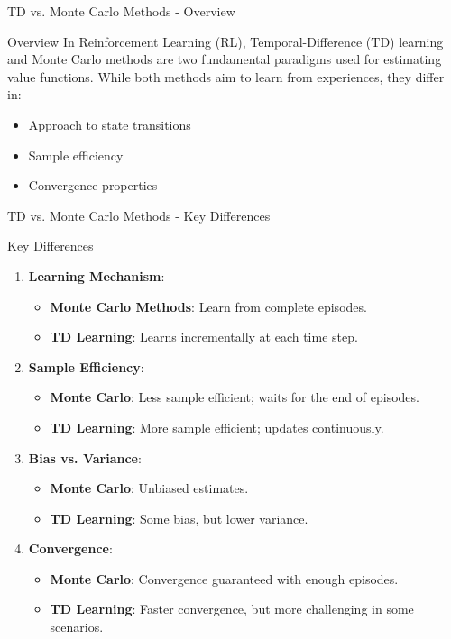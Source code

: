 \documentclass[aspectratio=169]{beamer}
\begin{document}
\begin{frame}[fragile]{TD vs. Monte Carlo Methods - Overview}
    \begin{block}{Overview}
        In Reinforcement Learning (RL), Temporal-Difference (TD) learning and Monte Carlo methods are two fundamental paradigms used for estimating value functions. While both methods aim to learn from experiences, they differ in:
        \begin{itemize}
            \item Approach to state transitions
            \item Sample efficiency
            \item Convergence properties
        \end{itemize}
    \end{block}
\end{frame}

\begin{frame}[fragile]{TD vs. Monte Carlo Methods - Key Differences}
    \begin{block}{Key Differences}
        \begin{enumerate}
            \item \textbf{Learning Mechanism}:
            \begin{itemize}
                \item \textbf{Monte Carlo Methods}: Learn from complete episodes.
                \item \textbf{TD Learning}: Learns incrementally at each time step.
            \end{itemize}
            \item \textbf{Sample Efficiency}:
            \begin{itemize}
                \item \textbf{Monte Carlo}: Less sample efficient; waits for the end of episodes.
                \item \textbf{TD Learning}: More sample efficient; updates continuously.
            \end{itemize}
            \item \textbf{Bias vs. Variance}:
            \begin{itemize}
                \item \textbf{Monte Carlo}: Unbiased estimates.
                \item \textbf{TD Learning}: Some bias, but lower variance.
            \end{itemize}
            \item \textbf{Convergence}:
            \begin{itemize}
                \item \textbf{Monte Carlo}: Convergence guaranteed with enough episodes.
                \item \textbf{TD Learning}: Faster convergence, but more challenging in some scenarios.
            \end{itemize}
        \end{enumerate}
    \end{block}
\end{frame}
\end{document}
